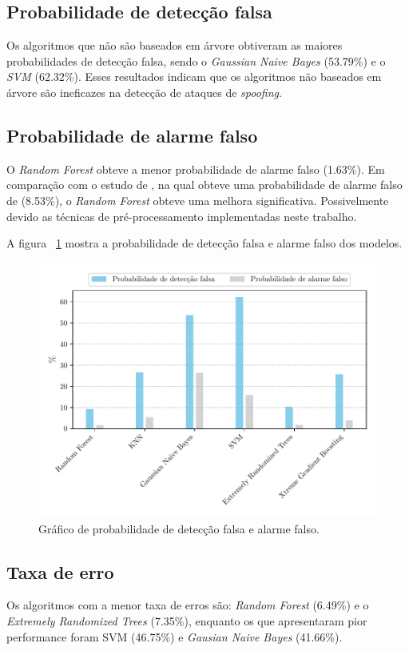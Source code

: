 \documentclass[12pt]{article}
\begin{document}
\subsection{Probabilidade de detecção falsa}
Os algoritmos que não são baseados em árvore obtiveram
as maiores probabilidades de detecção falsa,
sendo o \textit{Gaussian Naive Bayes} (53.79\%)
e o \textit{SVM} (62.32\%).
Esses resultados indicam que os algoritmos não baseados em árvore
são ineficazes na detecção de ataques de \textit{spoofing}.

\subsection{Probabilidade de alarme falso}

O \textit{Random Forest} obteve a menor probabilidade de alarme falso (1.63\%).
Em comparação com o estudo de \cite{Aissou2021},
na qual obteve uma probabilidade de alarme falso de (8.53\%),
o \textit{Random Forest} obteve uma melhora significativa.
Possivelmente devido as técnicas de pré-processamento
implementadas neste trabalho.

A figura ~\ref{fig:pmd_and_pfa} mostra a probabilidade
de detecção falsa e alarme falso dos modelos.

\begin{figure}[!ht]
  \centering
  \includegraphics[width=1\linewidth]{../plot_pmd_and_pfa.pdf}
  \caption{Gráfico de probabilidade de detecção falsa e alarme falso.}
  \label{fig:pmd_and_pfa}
\end{figure}

\subsection{Taxa de erro}
Os algoritmos com a menor taxa de erros são: \textit{Random Forest} (6.49\%) 
e o \textit{Extremely Randomized Trees} (7.35\%), 
enquanto os que apresentaram pior performance foram SVM (46.75\%) 
e \textit{Gausian Naive Bayes} (41.66\%). 
\end{document}
